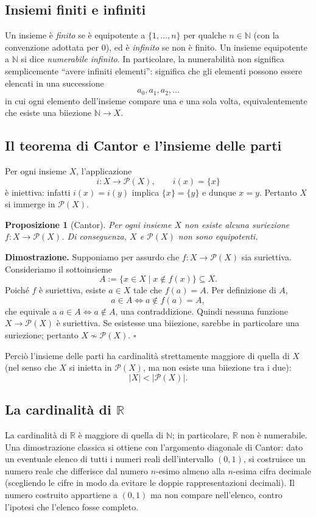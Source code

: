 \documentclass[11pt,a4paper]{article}
\newcommand{\Pot}{\mathcal{P}}
\theoremstyle{definition}
\theoremstyle{plain}
\newtheorem{proposizione}[definizione]{Proposizione}
\theoremstyle{remark}
\begin{document}
\subsection{Insiemi finiti e infiniti}
Un insieme è \emph{finito} se è equipotente a $\{1,\ldots,n\}$ per qualche $n\in\mathbb N$ (con la convenzione adottata per $0$), ed è \emph{infinito} se non è finito. Un insieme equipotente a $\mathbb N$ si dice \emph{numerabile infinito}. In particolare, la numerabilità non significa semplicemente ``avere infiniti elementi'': significa che gli elementi possono essere elencati in una successione
\[
a_0,a_1,a_2,\ldots
\]
in cui ogni elemento dell'insieme compare una e una sola volta, equivalentemente che esiste una biiezione $\mathbb N\to X$.

\subsection{Il teorema di Cantor e l'insieme delle parti}
Per ogni insieme $X$, l'applicazione
\[
i\colon X\to\Pot(X),\qquad i(x)=\{x\}
\]
è iniettiva: infatti $i(x)=i(y)$ implica $\{x\}=\{y\}$ e dunque $x=y$. Pertanto $X$ si immerge in $\Pot(X)$.

\begin{proposizione}[Cantor]
Per ogni insieme $X$ non esiste alcuna suriezione $f\colon X\to\Pot(X)$. Di conseguenza, $X$ e $\Pot(X)$ non sono equipotenti.
\end{proposizione}

\textbf{Dimostrazione.} Supponiamo per assurdo che $f\colon X\to\Pot(X)$ sia suriettiva. Consideriamo il sottoinsieme
\[
A:=\{x\in X\mid x\notin f(x)\}\subseteq X.
\]
Poiché $f$ è suriettiva, esiste $a\in X$ tale che $f(a)=A$. Per definizione di $A$,
\[
a\in A\iff a\notin f(a)=A,
\]
che equivale a $a\in A\iff a\notin A$, una contraddizione. Quindi nessuna funzione $X\to\Pot(X)$ è suriettiva. Se esistesse una biiezione, sarebbe in particolare una suriezione; pertanto $X\not\sim\Pot(X)$. \hfill$\square$

Perciò l'insieme delle parti ha cardinalità strettamente maggiore di quella di $X$ (nel senso che $X$ si inietta in $\Pot(X)$, ma non esiste una biiezione tra i due):
\[
|X|<|\Pot(X)|.
\]

\subsection{La cardinalità di $\mathbb R$}
La cardinalità di $\mathbb R$ è maggiore di quella di $\mathbb N$; in particolare, $\mathbb R$ non è numerabile. Una dimostrazione classica si ottiene con l'argomento diagonale di Cantor: dato un eventuale elenco di tutti i numeri reali dell'intervallo $(0,1)$, si costruisce un numero reale che differisce dal numero $n$-esimo almeno alla $n$-esima cifra decimale (scegliendo le cifre in modo da evitare le doppie rappresentazioni decimali). Il numero costruito appartiene a $(0,1)$ ma non compare nell'elenco, contro l'ipotesi che l'elenco fosse completo.
\end{document}
